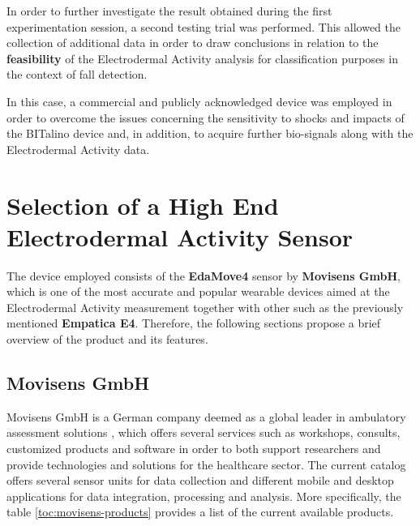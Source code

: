 \label{ch:collection}

%
%

In order to further investigate the result obtained during the first experimentation session, a second testing trial was performed. This allowed the collection of additional data in order to draw conclusions in relation to the \textbf{feasibility} of the Electrodermal Activity analysis for classification purposes in the context of fall detection.

In this case, a commercial and publicly acknowledged device was employed in order to overcome the issues concerning the sensitivity to shocks and impacts of the BITalino device and, in addition, to acquire further bio-signals along with the Electrodermal Activity data.

\section{Selection of a High End Electrodermal Activity Sensor}\label{sec:movisens}

The device employed consists of the \textbf{EdaMove4} sensor by \textbf{Movisens GmbH}, which is one of the most accurate and popular wearable devices aimed at the Electrodermal Activity measurement together with other such as the previously mentioned \textbf{Empatica E4}. Therefore, the following sections propose a brief overview of the product and its features.

\subsection{Movisens GmbH}\label{subsec:movisens-company}

Movisens GmbH is a German company deemed as a global leader in ambulatory assessment solutions \cite{movisens}, which offers several services such as workshops, consults, customized products and software in order to both support researchers and provide technologies and solutions for the healthcare sector.
The current catalog offers several sensor units for data collection and different mobile and desktop applications for data integration, processing and analysis. More specifically, the table \ref{toc:movisens-products} provides a list of the current available products.

